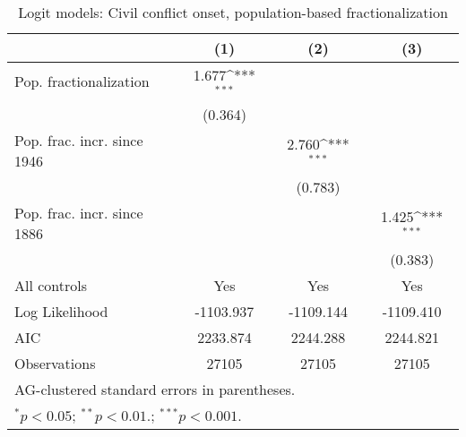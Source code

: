 \begin{table}[htbp]\centering
\def\sym#1{\ifmmode^{#1}\else\(^{#1}\)\fi}
\caption{Logit models: Civil conflict onset, population-based fractionalization \label{tab:rob:pop1}}
\begin{tabular}{l*{3}{c}}
\hline\hline
                    &\multicolumn{1}{c}{(1)}         &\multicolumn{1}{c}{(2)}         &\multicolumn{1}{c}{(3)}         \\
\hline
Pop. fractionalization&       1.677\sym{***}&                     &                     \\
                    &     (0.364)         &                     &                     \\
Pop. frac. incr. since 1946&                     &       2.760\sym{***}&                     \\
                    &                     &     (0.783)         &                     \\
Pop. frac. incr. since 1886&                     &                     &       1.425\sym{***}\\
                    &                     &                     &     (0.383)         \\
\hline
All controls        &         Yes         &         Yes         &         Yes         \\
Log Likelihood      &   -1103.937         &   -1109.144         &   -1109.410         \\
AIC                 &    2233.874         &    2244.288         &    2244.821         \\
Observations        &       27105         &       27105         &       27105         \\
\hline\hline
\multicolumn{4}{l}{\footnotesize AG-clustered standard errors in parentheses.}\\
\multicolumn{4}{l}{\footnotesize $^{*}p<0.05$; $^{**}p<0.01.$; $^{***}p<0.001.$ }\\
\end{tabular}
\end{table}
